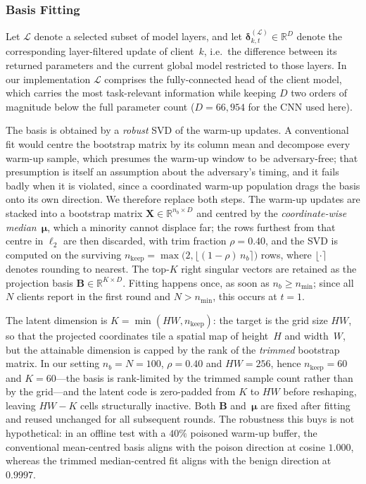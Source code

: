 \documentclass[journal]{IEEEtran}
\begin{document}
\subsubsection{Basis Fitting}
Let $\mathcal{L}$ denote a selected subset of model layers, and let $\boldsymbol{\delta}_{k,t}^{(\mathcal{L})} \in \mathbb{R}^{D}$ denote the corresponding layer-filtered update of client~$k$, i.e.\ the difference between its returned parameters and the current global model restricted to those layers. In our implementation $\mathcal{L}$ comprises the fully-connected head of the client model, which carries the most task-relevant information while keeping $D$ two orders of magnitude below the full parameter count ($D = 66{,}954$ for the CNN used here).

The basis is obtained by a \emph{robust} SVD of the warm-up updates. A conventional fit would centre the bootstrap matrix by its column mean and decompose every warm-up sample, which presumes the warm-up window to be adversary-free; that presumption is itself an assumption about the adversary's timing, and it fails badly when it is violated, since a coordinated warm-up population drags the basis onto its own direction. We therefore replace both steps. The warm-up updates are stacked into a bootstrap matrix $\mathbf{X} \in \mathbb{R}^{n_b \times D}$ and centred by the \emph{coordinate-wise median}~$\boldsymbol{\mu}$, which a minority cannot displace far; the rows furthest from that centre in $\ell_2$ are then discarded, with trim fraction $\rho = 0.40$, and the SVD is computed on the surviving $n_{\mathrm{keep}} = \max\bigl(2, \lfloor (1-\rho)\, n_b \rceil\bigr)$ rows, where $\lfloor \cdot \rceil$ denotes rounding to nearest. The top-$K$ right singular vectors are retained as the projection basis $\mathbf{B} \in \mathbb{R}^{K \times D}$. Fitting happens once, as soon as $n_b \geq n_{\min}$; since all $N$ clients report in the first round and $N > n_{\min}$, this occurs at $t = 1$.

The latent dimension is $K = \min(HW, n_{\mathrm{keep}})$: the target is the grid size $HW$, so that the projected coordinates tile a spatial map of height~$H$ and width~$W$, but the attainable dimension is capped by the rank of the \emph{trimmed} bootstrap matrix. In our setting $n_b = N = 100$, $\rho = 0.40$ and $HW = 256$, hence $n_{\mathrm{keep}} = 60$ and $K = 60$---the basis is rank-limited by the trimmed sample count rather than by the grid---and the latent code is zero-padded from $K$ to $HW$ before reshaping, leaving $HW - K$ cells structurally inactive. Both $\mathbf{B}$ and~$\boldsymbol{\mu}$ are fixed after fitting and reused unchanged for all subsequent rounds. The robustness this buys is not hypothetical: in an offline test with a $40\%$ poisoned warm-up buffer, the conventional mean-centred basis aligns with the poison direction at cosine $1.000$, whereas the trimmed median-centred fit aligns with the benign direction at $0.9997$.
\end{document}
